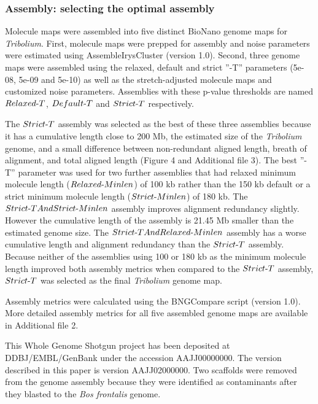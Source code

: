 \documentclass{bmcart}
\begin{document}
\subsubsection*{Assembly: selecting the optimal assembly}
Molecule maps were assembled into five distinct BioNano genome maps for \textit{Tribolium}. First, molecule maps were prepped for assembly and noise parameters were estimated using AssembleIrysCluster (version 1.0). Second, three genome maps were assembled using the relaxed, default and strict ”-T” parameters (5e-08, 5e-09 and 5e-10) as well as the stretch-adjusted molecule maps and customized noise parameters. Assemblies with these p-value thresholds are named $Relaxed\textnormal{-}T$, $Default\textnormal{-}T$ and $Strict\textnormal{-}T$ respectively. 

The $Strict\textnormal{-}T$ assembly was selected as the best of these three assemblies because it has a cumulative length close to 200 Mb, the estimated size of the \textit{Tribolium} genome, and a small difference between non-redundant aligned length, breath of alignment, and total aligned length (Figure 4 and Additional file 3). The best ”-T” parameter was used for two further assemblies that had relaxed minimum molecule length ($Relaxed\textnormal{-}Minlen$) of 100 kb rather than the 150 kb default or a strict minimum molecule length ($Strict\textnormal{-}Minlen$) of 180 kb. The $Strict\textnormal{-}TAndStrict\textnormal{-}Minlen$ assembly improves alignment redundancy slightly. However the cumulative length of the assembly is 21.45 Mb smaller than the estimated genome size. The $Strict\textnormal{-}TAndRelaxed\textnormal{-}Minlen$ assembly has a worse cumulative length and alignment redundancy than the $Strict\textnormal{-}T$ assembly. Because neither of the assemblies using 100 or 180 kb as the minimum molecule length improved both assembly metrics when compared to the $Strict\textnormal{-}T$ assembly, $Strict\textnormal{-}T$ was selected as the final \textit{Tribolium} genome map.

Assembly metrics were calculated using the BNGCompare script (version 1.0). More detailed assembly metrics for all five assembled genome maps are available in Additional file 2.

This Whole Genome Shotgun project has been deposited at DDBJ/EMBL/GenBank under the accession AAJJ00000000. The version described in this paper is version AAJJ02000000. Two scaffolds were removed from the genome assembly because they were identified as contaminants after they blasted to the \textit{Bos frontalis} genome.
\end{document}
